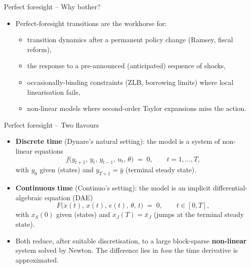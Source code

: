 \documentclass[11pt,aspectratio=169]{beamer}
\begin{document}
\begin{frame}{Perfect foresight -- Why bother?}

\begin{itemize}

\item Perfect-foresight transitions are the workhorse for:\newline
  \begin{itemize}
  \item transition dynamics after a permanent policy change
    (Ramsey, fiscal reform),\newline
  \item the response to a pre-announced (anticipated) sequence
    of shocks,\newline
  \item occasionally-binding constraints (ZLB, borrowing limits)
    where local linearisation fails,\newline
  \item non-linear models where second-order Taylor expansions miss
    the action.
  \end{itemize}

\end{itemize}

\end{frame}

\begin{frame}{Perfect foresight -- Two flavours}

\begin{itemize}

\item \textbf{Discrete time} (Dynare's natural setting): the model is
  a system of non-linear equations
  \[
  f\bigl(y_{t+1},\,y_t,\,y_{t-1},\,u_t,\,\theta\bigr) \;=\; 0,
  \qquad t = 1, \ldots, T,
  \]
  with $y_0$ given (states) and $y_{T+1} = \bar y$
  (terminal steady state).\newline

\item \textbf{Continuous time} (Continuo's setting): the model
  is an implicit differential-algebraic equation (DAE)
  \[
  F\bigl(\dot x(t),\, x(t),\, e(t),\, \theta,\, t\bigr) \;=\; 0,
  \qquad t \in [0,T],
  \]
  with $x_S(0)$ given (states) and $x_J(T) = \bar x_J$ (jumps at the
  terminal steady state).\newline

\item Both reduce, after suitable discretisation, to a large
  block-sparse \textbf{non-linear} system solved by Newton. The
  difference lies in \emph{how} the time derivative is approximated.

\end{itemize}

\end{frame}
\end{document}
